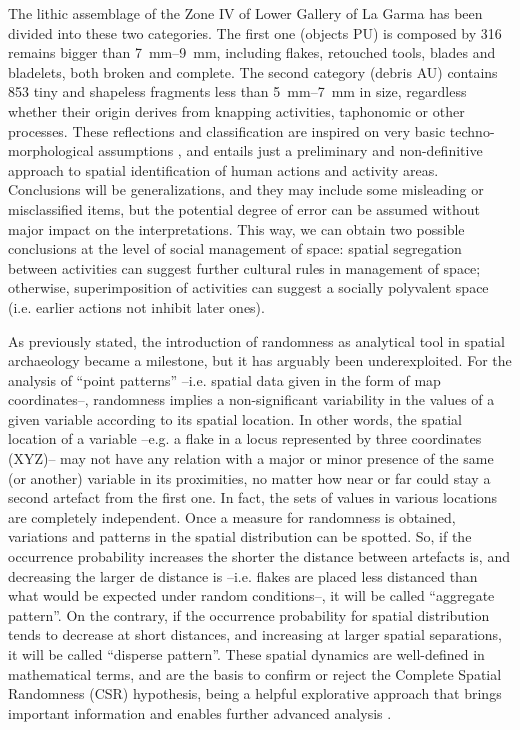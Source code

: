 The lithic assemblage of the Zone IV of Lower Gallery of La Garma has been divided into these two categories. The first one (objects PU) is composed by \num{316} remains bigger than \SIrange{7}{9}{\milli\meter}, including flakes, retouched tools, blades and bladelets, both broken and complete. The second category (debris AU) contains 853 tiny and shapeless fragments less than \SIrange{5}{7}{\milli\meter} in size, regardless whether their origin derives from knapping activities, taphonomic or other processes. These reflections and classification are inspired on very basic techno-morphological assumptions \parencites[see][]{Carbonell_1992}{Inizan_1999}{Mora_1992}, and entails just a preliminary and non-definitive approach to spatial identification of human actions and activity areas. 
Conclusions will be generalizations, and they may include some misleading or misclassified items, but the potential degree of error can be assumed without major impact on the interpretations. This way, we can obtain two possible conclusions at the level of social management of space: spatial segregation between activities can suggest further cultural rules in management of space; otherwise, superimposition of activities can suggest a socially polyvalent space (i.e. earlier actions not inhibit later ones).


As previously stated, the introduction of randomness as analytical tool in spatial archaeology became a milestone, but it has arguably been underexploited. For the analysis of “point patterns” –i.e. spatial data given in the form of map coordinates–, randomness implies a non-significant variability in the values of a given variable according to its spatial location. In other words, the spatial location of a variable –e.g. a flake in a locus represented by three coordinates (XYZ)– may not have any relation with a major or minor presence of the same (or another) variable in its proximities, no matter how near or far could stay a second artefact from the first one. In fact, the sets of values in various locations are completely independent. Once a measure for randomness is obtained, variations and patterns in the spatial distribution can be spotted. So, if the occurrence probability increases the shorter the distance between artefacts is, and decreasing the larger de distance is –i.e. flakes are placed less distanced than what would be expected under random conditions–, it will be called “aggregate pattern”. On the contrary, if the occurrence probability for spatial distribution tends to decrease at short distances, and increasing at larger spatial separations, it will be called “disperse pattern”. These spatial dynamics are well-defined in mathematical terms, and are the basis to confirm or reject the Complete Spatial Randomness (CSR) hypothesis, being a helpful explorative approach that brings important information and enables further advanced analysis \parencites{Bailey_1995}{Bevan_2013}{Illian_2008}{Maximiano_2008}.

